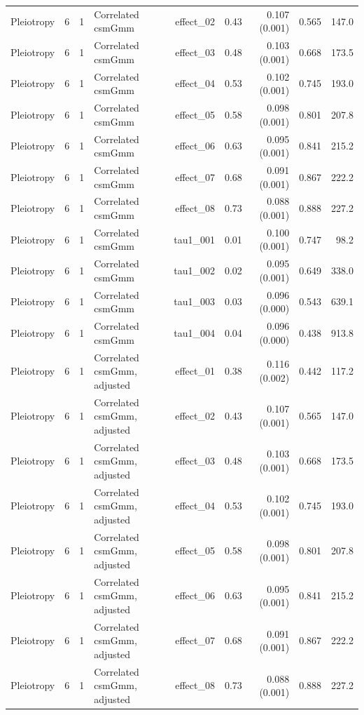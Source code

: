 \begin{longtable}{lcclrrrrr}
Pleiotropy & 6 & 1 & Correlated csmGmm & effect\_02 & 0.43 & 0.107 (0.001) & 0.565 & 147.0\\
Pleiotropy & 6 & 1 & Correlated csmGmm & effect\_03 & 0.48 & 0.103 (0.001) & 0.668 & 173.5\\
Pleiotropy & 6 & 1 & Correlated csmGmm & effect\_04 & 0.53 & 0.102 (0.001) & 0.745 & 193.0\\
Pleiotropy & 6 & 1 & Correlated csmGmm & effect\_05 & 0.58 & 0.098 (0.001) & 0.801 & 207.8\\
Pleiotropy & 6 & 1 & Correlated csmGmm & effect\_06 & 0.63 & 0.095 (0.001) & 0.841 & 215.2\\
Pleiotropy & 6 & 1 & Correlated csmGmm & effect\_07 & 0.68 & 0.091 (0.001) & 0.867 & 222.2\\
Pleiotropy & 6 & 1 & Correlated csmGmm & effect\_08 & 0.73 & 0.088 (0.001) & 0.888 & 227.2\\
Pleiotropy & 6 & 1 & Correlated csmGmm & tau1\_001 & 0.01 & 0.100 (0.001) & 0.747 & 98.2\\
Pleiotropy & 6 & 1 & Correlated csmGmm & tau1\_002 & 0.02 & 0.095 (0.001) & 0.649 & 338.0\\
Pleiotropy & 6 & 1 & Correlated csmGmm & tau1\_003 & 0.03 & 0.096 (0.000) & 0.543 & 639.1\\
Pleiotropy & 6 & 1 & Correlated csmGmm & tau1\_004 & 0.04 & 0.096 (0.000) & 0.438 & 913.8\\
Pleiotropy & 6 & 1 & Correlated csmGmm, adjusted & effect\_01 & 0.38 & 0.116 (0.002) & 0.442 & 117.2\\
Pleiotropy & 6 & 1 & Correlated csmGmm, adjusted & effect\_02 & 0.43 & 0.107 (0.001) & 0.565 & 147.0\\
Pleiotropy & 6 & 1 & Correlated csmGmm, adjusted & effect\_03 & 0.48 & 0.103 (0.001) & 0.668 & 173.5\\
Pleiotropy & 6 & 1 & Correlated csmGmm, adjusted & effect\_04 & 0.53 & 0.102 (0.001) & 0.745 & 193.0\\
Pleiotropy & 6 & 1 & Correlated csmGmm, adjusted & effect\_05 & 0.58 & 0.098 (0.001) & 0.801 & 207.8\\
Pleiotropy & 6 & 1 & Correlated csmGmm, adjusted & effect\_06 & 0.63 & 0.095 (0.001) & 0.841 & 215.2\\
Pleiotropy & 6 & 1 & Correlated csmGmm, adjusted & effect\_07 & 0.68 & 0.091 (0.001) & 0.867 & 222.2\\
Pleiotropy & 6 & 1 & Correlated csmGmm, adjusted & effect\_08 & 0.73 & 0.088 (0.001) & 0.888 & 227.2\\

\end{longtable}
